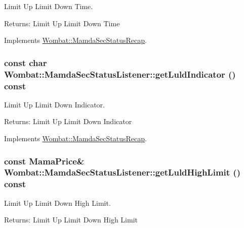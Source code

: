 Limit Up Limit Down Time. 

\begin{Desc}
\item[Returns:]Limit Up Limit Down Time \end{Desc}


Implements \hyperlink{classWombat_1_1MamdaSecStatusRecap_b53e48f73896500f5f752c6ee5d51a0c}{Wombat::Mamda\-Sec\-Status\-Recap}.\hypertarget{classWombat_1_1MamdaSecStatusListener_eee57407b1b230ed6886469a56007980}{
\subsubsection[getLuldIndicator]{\setlength{\rightskip}{0pt plus 5cm}const char Wombat::Mamda\-Sec\-Status\-Listener::get\-Luld\-Indicator () const}}
\label{classWombat_1_1MamdaSecStatusListener_eee57407b1b230ed6886469a56007980}


Limit Up Limit Down Indicator. 

\begin{Desc}
\item[Returns:]Limit Up Limit Down Indicator \end{Desc}


Implements \hyperlink{classWombat_1_1MamdaSecStatusRecap_acecbbeb305d9e37961598e3c7bce2b3}{Wombat::Mamda\-Sec\-Status\-Recap}.\hypertarget{classWombat_1_1MamdaSecStatusListener_92b109794eecdf44d3ae6f9ff6113a2b}{
\subsubsection[getLuldHighLimit]{\setlength{\rightskip}{0pt plus 5cm}const Mama\-Price\& Wombat::Mamda\-Sec\-Status\-Listener::get\-Luld\-High\-Limit () const}}
\label{classWombat_1_1MamdaSecStatusListener_92b109794eecdf44d3ae6f9ff6113a2b}


Limit Up Limit Down High Limit. 

\begin{Desc}
\item[Returns:]Limit Up Limit Down High Limit \end{Desc}


